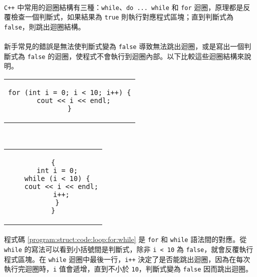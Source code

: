 \documentclass[12pt,a4paper,oneside]{report}
\begin{document}
\begin{CJK}{UTF8}{bkai}
\paragraph{}\texttt{C++} 中常用的迴圈結構有三種：\lstinline!while!、\lstinline!do ... while! 和 \lstinline!for! 迴圈，原理都是反覆檢查一個判斷式，如果結果為 \lstinline!true! 則執行對應程式區塊；直到判斷式為 \lstinline!false!，則跳出迴圈結構。
\paragraph{}新手常見的錯誤是無法使判斷式變為 \lstinline!false! 導致無法跳出迴圈，或是寫出一個判斷式為 \lstinline!false! 的迴圈，使程式不會執行到迴圈內部。以下比較這些迴圈結構來說明。

\begin{code}[h!]
\centering
\begin{subcode}{.48\textwidth}
\centering
\begin{tabular}{c}
\begin{lstlisting}
for (int i = 0; i < 10; i++) {
  cout << i << endl;
}
\end{lstlisting}
\end{tabular}
\caption{\lstinline!for! 語法}
\end{subcode}
~
\begin{subcode}{.48\textwidth}
\centering
\begin{tabular}{c}
\begin{lstlisting}
{
  int i = 0;
  while (i < 10) {
    cout << i << endl;
    i++;
  }
}
\end{lstlisting}
\end{tabular}
\caption{對應的 \lstinline!while! 語法}
\end{subcode}
\caption{\lstinline!for! 和 \lstinline!while! 的對應關係}
\label{program:struct:code:loop:for:while}
\end{code}

\paragraph{}程式碼 \ref{program:struct:code:loop:for:while} 是 \lstinline!for! 和 \lstinline!while! 語法間的對應。從 \lstinline!while! 的寫法可以看到小括號間是判斷式，除非 \lstinline!i < 10! 為 \lstinline!false!，就會反覆執行程式區塊。在 \lstinline!while! 迴圈中最後一行，\lstinline!i++! 決定了是否能跳出迴圈，因為在每次執行完迴圈時，\lstinline!i! 值會遞增，直到不小於 \lstinline!10!，判斷式變為 \lstinline!false! 因而跳出迴圈。


\end{CJK}
\end{document}
